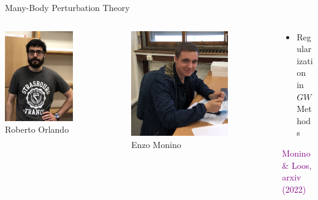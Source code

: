 \documentclass[aspectratio=169,9pt]{beamer}
\newcommand{\pub}[1]{{\small \textcolor{purple}{#1}}}
\begin{document}
\begin{frame}{Many-Body Perturbation Theory}
        \begin{columns}
                \begin{column}{0.25\textwidth}
\centering
\includegraphics[width=0.6\textwidth]{fig/Roberto}
\\
Roberto Orlando
                \end{column}
                \begin{column}{0.25\textwidth}
\centering
\includegraphics[width=0.7\textwidth]{fig/Enzo}
\\
Enzo Monino
                \end{column}

                \begin{column}{0.50\textwidth}
		\begin{itemize}
			\item Regularization in $GW$ Methods
		\end{itemize}
		\pub{Monino \& Loos, arxiv (2022)}
                \end{column}
                \end{columns}

\end{frame}
\end{document}
